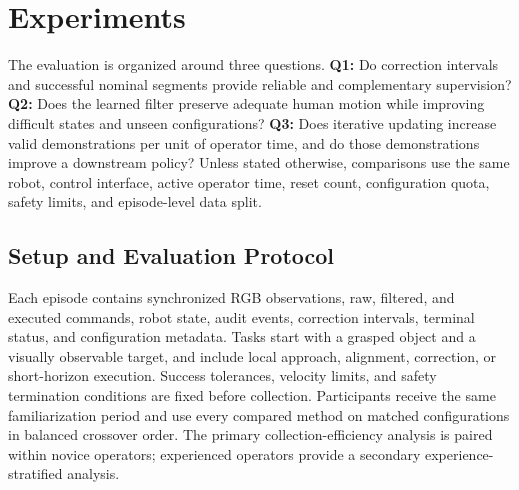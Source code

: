 \section{Experiments}
\label{sec:experiments}

The evaluation is organized around three questions. \textbf{Q1:} Do correction
intervals and successful nominal segments provide reliable and complementary
supervision? \textbf{Q2:} Does the learned filter preserve adequate human
motion while improving difficult states and unseen configurations?
\textbf{Q3:} Does iterative updating increase valid demonstrations per unit of
operator time, and do those demonstrations improve a downstream policy?
Unless stated otherwise, comparisons use the same robot, control interface,
active operator time, reset count, configuration quota, safety limits, and
episode-level data split.

\subsection{Setup and Evaluation Protocol}
\label{sec:exp_setup}

Each episode contains synchronized RGB observations, raw, filtered, and
executed commands, robot state, audit events, correction intervals, terminal
status, and configuration metadata. Tasks start with a grasped object and a
visually observable target, and include local approach, alignment, correction,
or short-horizon execution. Success tolerances, velocity limits, and safety
termination conditions are fixed before collection. Participants receive the
same familiarization period and use every compared method on matched
configurations in balanced crossover order. The primary collection-efficiency
analysis is paired within novice operators; experienced operators provide a
secondary experience-stratified analysis.

